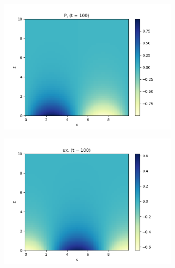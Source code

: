 \documentclass[11pt,
        usenames, %
        dvipsnames %
    ]{report}
\begin{document}
\begin{figure}[!h]
    \begin{subfigure}{0.3\textwidth}
        \centering
        \includegraphics[width=\textwidth]{plots/no_g_P_t100.png}
    \end{subfigure}
    \begin{subfigure}{0.3\textwidth}
        \centering
        \includegraphics[width=\textwidth]{plots/no_g_ux_t100.png}
    \end{subfigure}
    \begin{subfigure}{0.3\textwidth}
        \centering

\end{subfigure}
\end{figure}
\end{document}
